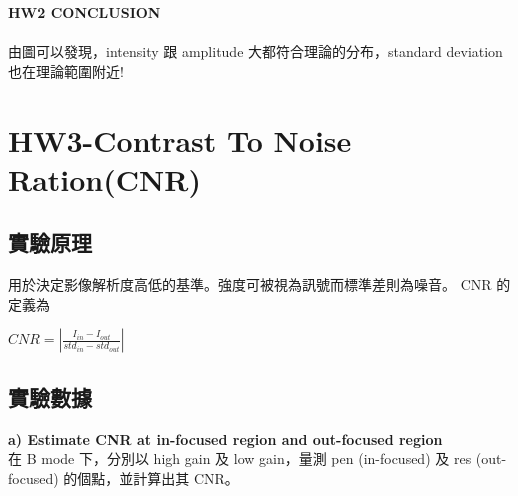 \documentclass[12pts,a4paper]{article}
\begin{document}
\textbf{HW2 CONCLUSION} \\
\\
由圖可以發現，intensity 跟 amplitude 大都符合理論的分布，standard deviation 也在理論範圍附近!
\pagebreak
\section{HW3-Contrast To Noise Ration(CNR)}
\subsection{實驗原理}
用於決定影像解析度高低的基準。強度可被視為訊號而標準差則為噪音。 CNR 的定義為
\begin{center}
$CNR=|\frac{I_{in}-I_{out}}{std_{in}-std_{out}}|$
\end{center}
\subsection{實驗數據}
\textbf{a) Estimate CNR at in-focused region and out-focused region} \\
在 B mode 下，分別以 high gain 及 low gain，量測 pen (in-focused) 及 res (out-focused) 的個點，並計算出其 CNR。
\end{document}
